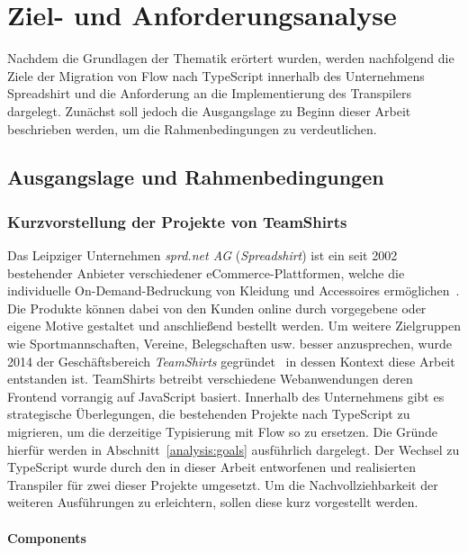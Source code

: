 \chapter{Ziel- und Anforderungsanalyse}
\label{chap:analysis}

Nachdem die Grundlagen der Thematik erörtert wurden, werden nachfolgend die Ziele der Migration von Flow nach TypeScript innerhalb des Unternehmens Spreadshirt und die Anforderung an die Implementierung des Transpilers dargelegt. Zunächst soll jedoch die Ausgangslage zu Beginn dieser Arbeit beschrieben werden, um die Rahmenbedingungen zu verdeutlichen.

\section{Ausgangslage und Rahmenbedingungen}
\label{sec:status-quo}

\subsection{Kurzvorstellung der Projekte von TeamShirts}
\label{subsec:ts-projects}

Das Leipziger Unternehmen \textit{sprd.net AG} (\textit{Spreadshirt}) ist ein seit 2002 bestehender Anbieter verschiedener eCommerce-Plattformen, welche die individuelle On-Demand-Bedruckung von Kleidung und Accessoires ermöglichen~\autocite{SPREADSHIRT:ABOUT}. Die Produkte können dabei von den Kunden online durch vorgegebene oder eigene Motive gestaltet und anschließend bestellt werden. Um weitere Zielgruppen wie Sportmannschaften, Vereine, Belegschaften usw. besser anzusprechen, wurde 2014 der Geschäftsbereich \textit{TeamShirts} gegründet~\autocite{TEAMSHIRTS:ABOUT} in dessen Kontext diese Arbeit entstanden ist. TeamShirts betreibt verschiedene Webanwendungen deren Frontend vorrangig auf JavaScript basiert. Innerhalb des Unternehmens gibt es strategische Überlegungen, die bestehenden Projekte nach TypeScript zu migrieren, um die derzeitige Typisierung mit Flow so zu ersetzen. Die Gründe hierfür werden in Abschnitt~\ref{analysis:goals} ausführlich dargelegt. Der Wechsel zu TypeScript wurde durch den in dieser Arbeit entworfenen und realisierten Transpiler für zwei dieser Projekte umgesetzt. Um die Nachvollziehbarkeit der weiteren Ausführungen zu erleichtern, sollen diese kurz vorgestellt werden.

\subsubsection{Components}

